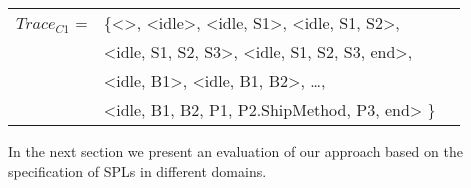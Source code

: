 \begin{small}
\begin{tabular}{rlc}
$Trace_{C1}$ = & \{<>, <idle>, <idle, S1>, <idle, S1, S2>, \\
                    & <idle, S1, S2, S3>,  <idle, S1, S2, S3, end>, \\
                    & <idle, B1>, <idle, B1, B2>, \ldots, \\
                    & <idle, B1, B2, P1, P2.ShipMethod, P3, end> \}
\end{tabular}
\end{small}


In the next section we present an evaluation of our approach based on the
specification of SPLs in different domains.


%
%
%
